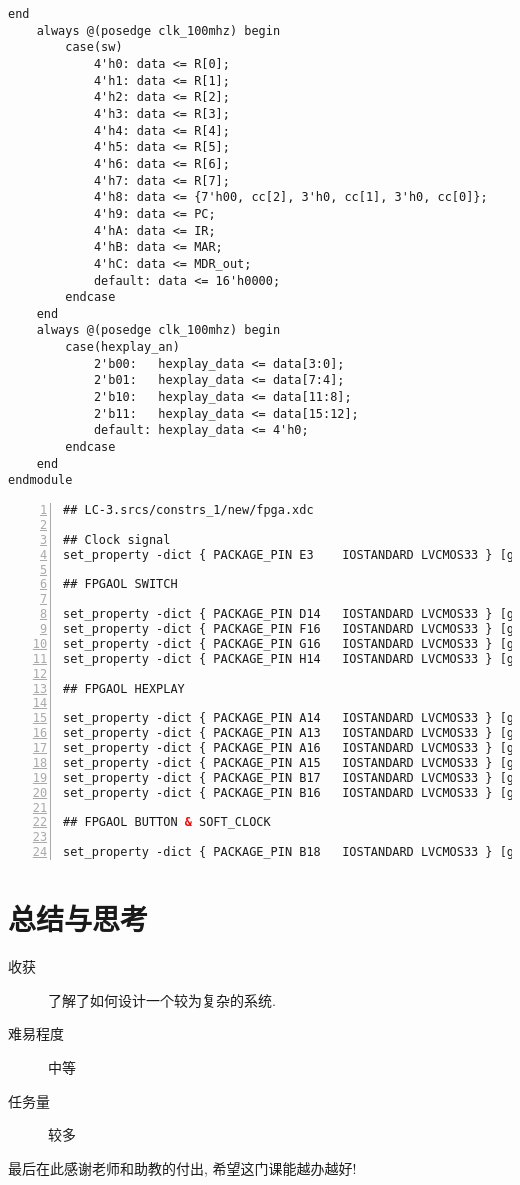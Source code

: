 \documentclass[UTF8,fontset=fandol]{ctexart}
\begin{document}
\begin{lstlisting}[style = verilogstyle, caption = 模块文件源代码, label = Code:Source, breaklines = true]
    end
    always @(posedge clk_100mhz) begin
        case(sw)
            4'h0: data <= R[0];
            4'h1: data <= R[1];
            4'h2: data <= R[2];
            4'h3: data <= R[3];
            4'h4: data <= R[4];
            4'h5: data <= R[5];
            4'h6: data <= R[6];
            4'h7: data <= R[7];
            4'h8: data <= {7'h00, cc[2], 3'h0, cc[1], 3'h0, cc[0]};
            4'h9: data <= PC;
            4'hA: data <= IR;
            4'hB: data <= MAR;
            4'hC: data <= MDR_out;
            default: data <= 16'h0000;
        endcase
    end
    always @(posedge clk_100mhz) begin
        case(hexplay_an)
            2'b00:   hexplay_data <= data[3:0];
            2'b01:   hexplay_data <= data[7:4];
            2'b10:   hexplay_data <= data[11:8];
            2'b11:   hexplay_data <= data[15:12];
            default: hexplay_data <= 4'h0;
        endcase
    end
endmodule
\end{lstlisting}
\begin{lstlisting}[basicstyle = \footnotesize\ttfamily, breaklines=true, numbers = left, language = XML, frame=lrtb, frameround=tttt, caption={约束文件}, label=Code:Constraint]
## LC-3.srcs/constrs_1/new/fpga.xdc

## Clock signal
set_property -dict { PACKAGE_PIN E3    IOSTANDARD LVCMOS33 } [get_ports { clk_100mhz }];

## FPGAOL SWITCH

set_property -dict { PACKAGE_PIN D14   IOSTANDARD LVCMOS33 } [get_ports { sw[0] }];
set_property -dict { PACKAGE_PIN F16   IOSTANDARD LVCMOS33 } [get_ports { sw[1] }];
set_property -dict { PACKAGE_PIN G16   IOSTANDARD LVCMOS33 } [get_ports { sw[2] }];
set_property -dict { PACKAGE_PIN H14   IOSTANDARD LVCMOS33 } [get_ports { sw[3] }];

## FPGAOL HEXPLAY

set_property -dict { PACKAGE_PIN A14   IOSTANDARD LVCMOS33 } [get_ports { hexplay_data[0] }];
set_property -dict { PACKAGE_PIN A13   IOSTANDARD LVCMOS33 } [get_ports { hexplay_data[1] }];
set_property -dict { PACKAGE_PIN A16   IOSTANDARD LVCMOS33 } [get_ports { hexplay_data[2] }];
set_property -dict { PACKAGE_PIN A15   IOSTANDARD LVCMOS33 } [get_ports { hexplay_data[3] }];
set_property -dict { PACKAGE_PIN B17   IOSTANDARD LVCMOS33 } [get_ports { hexplay_an[0] }];
set_property -dict { PACKAGE_PIN B16   IOSTANDARD LVCMOS33 } [get_ports { hexplay_an[1] }];

## FPGAOL BUTTON & SOFT_CLOCK

set_property -dict { PACKAGE_PIN B18   IOSTANDARD LVCMOS33 } [get_ports { btn }];
\end{lstlisting}
\section*{总结与思考}
\begin{description}
  \item[收获] 了解了如何设计一个较为复杂的系统.
  \item[难易程度] 中等
  \item[任务量] 较多
\end{description}
\centering
最后在此感谢老师和助教的付出, 希望这门课能越办越好!
\end{document}
